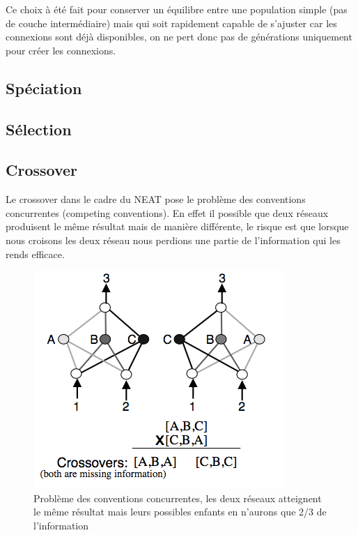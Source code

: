 \documentclass{article}
\begin{document}
Ce choix à été fait pour conserver un équilibre entre une population simple (pas de couche intermédiaire) mais qui soit rapidement capable de s'ajuster car les connexions sont déjà disponibles, on ne pert donc pas de générations uniquement pour créer les connexions.

\subsection{Spéciation}

\subsection{Sélection}


\subsection{Crossover}

Le crossover dans le cadre du NEAT pose le problème des conventions concurrentes (competing conventions). En effet il possible que deux réseaux produisent le même résultat mais de manière différente, le risque est que lorsque nous croisons les deux réseau nous perdions une partie de l'information qui les rends efficace.

\begin{figure}[h]
\begin{center}
	\includegraphics[scale=0.5]{competingconventions.png}
	\caption{Problème des conventions concurrentes, les deux réseaux atteignent le même résultat mais leurs possibles enfants en n'aurons que 2/3 de l'information \cite{neatpaper}}
\end{center}
\end{figure}
\newpage
\end{document}
